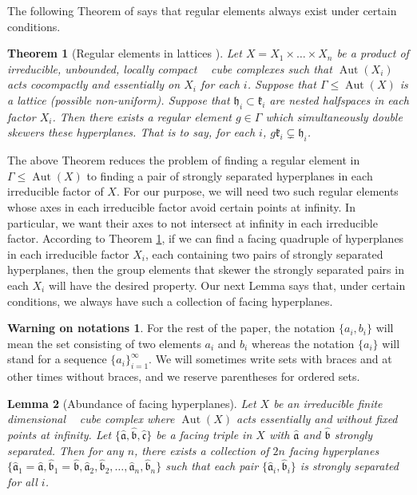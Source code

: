\documentclass{amsart}
\newtheorem{theorem}{Theorem}%
\newtheorem{lemma}[theorem]{Lemma}
\theoremstyle{definition}
\newtheorem*{Notation warning}{Warning on notations}
\newtheorem*{Sketch of proof}{Sketch of proof for Theorem C}
\newcommand{\h}{{\mathfrak h}}
\newcommand{\hA}{\hat{\mathfrak a}}
\newcommand{\hB}{\hat{\mathfrak b}}
\newcommand{\hC}{\hat{\mathfrak c}}
\DeclareMathOperator{\cat}{CAT(0)}
\def\aut{\mathop{\mathrm{Aut}}\nolimits}
\begin{document}
\begin{sloppypar}
The following Theorem of \cite{Caprace_2011} says that regular elements always exist under certain conditions. 


\begin{theorem}[Regular elements in lattices \cite{Caprace_2011}]\label{Regular elements in lattices}
    Let $X=X_1\times\ldots \times X_n$ be a product of irreducible, unbounded, locally compact
$\cat$ cube complexes such that $\aut(X_i)$ acts cocompactly and essentially on $X_i$ for each
$i$. Suppose that $\Gamma\le\aut(X)$ is a lattice (possible non-uniform).
Suppose that $\h_i\subset \mathfrak{k}_i$ are nested
halfspaces in each factor $X_i$. Then there exists a regular element $g\in \Gamma$ which simultaneously
double skewers these hyperplanes. That is to say, for each $i$, $g\mathfrak{k}_i \subsetneq \h_i$.  
\end{theorem}

The above Theorem reduces the problem of finding a regular element in $\Gamma\le\aut(X)$ to finding a pair of strongly separated hyperplanes in each irreducible factor of $X$.
For our purpose, we will need two such regular elements  whose axes in each irreducible factor avoid certain points at infinity.
In particular, we want their axes to not intersect at infinity in each irreducible factor.
 According to Theorem \ref{Regular elements in lattices}, if we can find a facing quadruple of hyperplanes in each irreducible factor $X_i$, each  containing two pairs of strongly separated hyperplanes, then the group elements that skewer the strongly separated pairs in each $X_i$ will have the desired property. Our next Lemma says that, under certain conditions, we always have such a collection of facing hyperplanes.


\begin{Notation warning} For the rest of the paper, the notation $\{a_i,b_i\}$ will mean the set consisting of two elements $a_i$ and  $b_i$ whereas the notation $\{a_i\}$ will stand for a sequence $\{a_i\}_{i=1}^\infty$. 
 We will sometimes write sets with braces and at other times without braces, and we reserve parentheses for ordered sets.
 \end{Notation warning}

\begin{lemma}[Abundance of facing hyperplanes]\label{l:many facing hyperplanes}
    Let $X$ be an irreducible finite dimensional $\cat$ cube complex where $\aut(X)$ acts essentially and without fixed points at infinity. Let $\{\hA,\hB,\hC\}$ be a facing triple in $X$ with $\hA$ and $\hB$ strongly separated. Then for any $n$, there exists a collection of $2n$ facing hyperplanes $\{\hA_1=\hA,\hB_1=\hB,\hA_2,\hB_2,\ldots,\hA_n,\hB_n\}$ such that each pair $\{\hA_i,\hB_i\}$ is strongly separated for all $i$.
\end{lemma}


\end{sloppypar}
\end{document}
